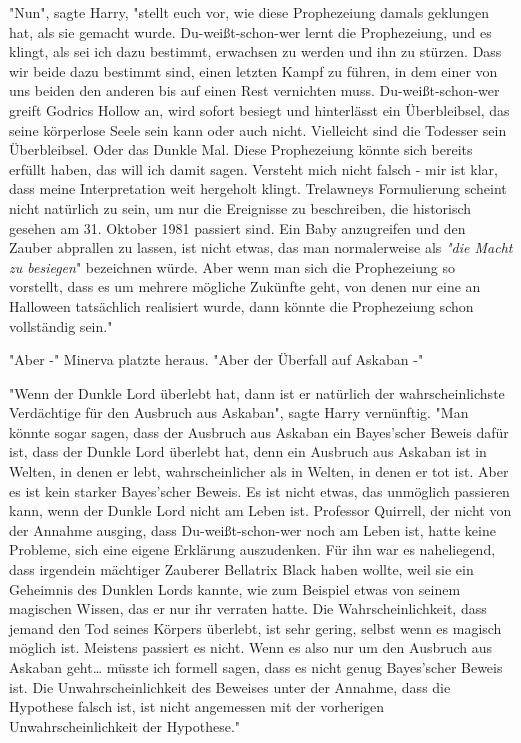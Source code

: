 {"Nun", sagte Harry, "stellt euch vor, wie diese Prophezeiung damals geklungen hat, als sie gemacht wurde. Du-weißt-schon-wer lernt die Prophezeiung, und es klingt, als sei ich dazu bestimmt, erwachsen zu werden und ihn zu stürzen. Dass wir beide dazu bestimmt sind, einen letzten Kampf zu führen, in dem einer von uns beiden den anderen bis auf einen Rest vernichten muss. Du-weißt-schon-wer greift Godrics Hollow an, wird sofort besiegt und hinterlässt ein Überbleibsel, das seine körperlose Seele sein kann oder auch nicht. Vielleicht sind die Todesser sein Überbleibsel. Oder das Dunkle Mal. Diese Prophezeiung könnte sich bereits erfüllt haben, das will ich damit sagen. Versteht mich nicht falsch - mir ist klar, dass meine Interpretation weit hergeholt klingt. Trelawneys Formulierung scheint nicht natürlich zu sein, um nur die Ereignisse zu beschreiben, die historisch gesehen am 31. Oktober 1981 passiert sind. Ein Baby anzugreifen und den Zauber abprallen zu lassen, ist nicht etwas, das man normalerweise als \emph{"die Macht zu besiegen}" bezeichnen würde. Aber wenn man sich die Prophezeiung so vorstellt, dass es um mehrere mögliche Zukünfte geht, von denen nur eine an Halloween tatsächlich realisiert wurde, dann könnte die Prophezeiung schon vollständig sein."

"Aber -" Minerva platzte heraus. "Aber der Überfall auf Askaban -"

"Wenn der Dunkle Lord überlebt hat, dann ist er natürlich der wahrscheinlichste Verdächtige für den Ausbruch aus Askaban", sagte Harry vernünftig. "Man könnte sogar sagen, dass der Ausbruch aus Askaban ein Bayes'scher Beweis dafür ist, dass der Dunkle Lord überlebt hat, denn ein Ausbruch aus Askaban ist in Welten, in denen er lebt, wahrscheinlicher als in Welten, in denen er tot ist. Aber es ist kein starker Bayes'scher Beweis. Es ist nicht etwas, das unmöglich passieren kann, wenn der Dunkle Lord nicht am Leben ist. Professor Quirrell, der nicht von der Annahme ausging, dass Du-weißt-schon-wer noch am Leben ist, hatte keine Probleme, sich eine eigene Erklärung auszudenken. Für ihn war es naheliegend, dass irgendein mächtiger Zauberer Bellatrix Black haben wollte, weil sie ein Geheimnis des Dunklen Lords kannte, wie zum Beispiel etwas von seinem magischen Wissen, das er nur ihr verraten hatte. Die Wahrscheinlichkeit, dass jemand den Tod seines Körpers überlebt, ist sehr gering, selbst wenn es magisch möglich ist. Meistens passiert es nicht. Wenn es also nur um den Ausbruch aus Askaban geht… müsste ich formell sagen, dass es nicht genug Bayes'scher Beweis ist. Die Unwahrscheinlichkeit des Beweises unter der Annahme, dass die Hypothese falsch ist, ist nicht angemessen mit der vorherigen Unwahrscheinlichkeit der Hypothese."

}
